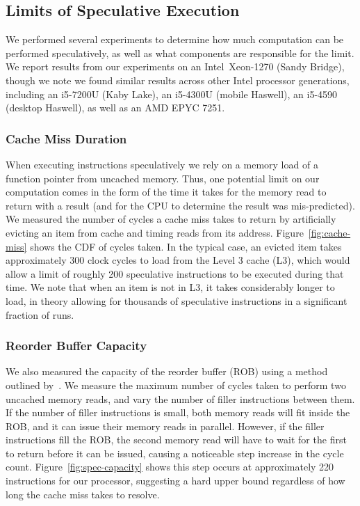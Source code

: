 \subsection{Limits of Speculative Execution}

\FigCacheMiss

\FigSpecMeasure

We performed several experiments to determine how much computation can be
performed
speculatively, as well as what components are responsible for the limit.
We report results from our experiments on an Intel~Xeon-1270 (Sandy Bridge),
though we note we found similar results across other Intel processor generations,
including an i5-7200U (Kaby Lake), %
an i5-4300U (mobile Haswell), %
an i5-4590 (desktop Haswell), %
as well as an AMD EPYC 7251. %



\subsubsection{Cache Miss Duration}
When executing instructions speculatively we rely on a memory load of a function
pointer from uncached memory. Thus, one potential limit on our computation comes
in the form of the time it takes for the memory read to return with a result
(and for the CPU to determine the result was mis-predicted).
We measured the number of cycles a
cache miss takes to return by artificially evicting an item from cache and
timing reads from its address.
Figure~\ref{fig:cache-miss} shows the CDF of cycles taken. In the typical case,
an evicted item takes approximately 300 clock cycles to load from the Level 3 cache (L3), which
would allow a limit of roughly 200 speculative instructions to be
executed during that time. We note that when an item is not in L3, it takes
considerably longer to load, in theory allowing for thousands of speculative
instructions in a significant fraction of runs.


\subsubsection{Reorder Buffer Capacity} \label{sssec:ROB}
We also measured the capacity of the reorder buffer (ROB) using a method
outlined by~\cite{measuring-rob}. We measure the maximum number of cycles taken
to perform two uncached memory reads, and vary the number of filler instructions
between them. If the number of filler instructions is small, both memory reads
will fit inside the ROB, and it can issue their memory reads in parallel.
However, if the filler instructions fill the ROB, the second memory read will
have to wait for the first to return before it can be issued, causing a
noticeable step increase in the cycle count. Figure~\ref{fig:spec-capacity}
shows this step occurs at approximately 220 instructions for our processor,
suggesting a hard upper bound regardless of how long the cache miss takes to
resolve.

